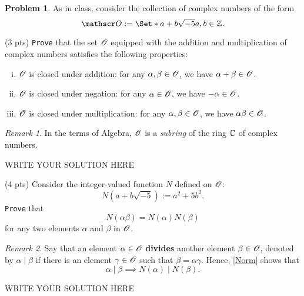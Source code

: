 \documentclass[11pt]{article}
\theoremstyle{plain}
\theoremstyle{definition}
\newtheorem{problem}{Problem}
\theoremstyle{remark}
\newtheorem*{remark}{Remark}
\numberwithin{equation}{problem}
\providecommand\given{}
\begin{document}
\begin{problem}\label{p4}
	As in class, consider the collection of complex numbers of the form
	\[
		\scrO := \Set*{	a+b\sqrt{-5}	\given	a,b\in\Z	}.
	\]
	\begin{listinprob}
		\item (3 pts) \texttt{Prove} that the set $\mathscr{O}$ equipped with the addition and multiplication of complex numbers satisfies the following properties:
		\begin{enumerate}[(i)]
			\item $\mathscr{O}$ is closed under addition: for any $\alpha,\beta\in\mathscr{O}$, we have $\alpha+\beta\in\mathscr{O}$.
			\item $\mathscr{O}$ is closed under negation: for any $\alpha\in\mathscr{O}$, we have $-\alpha\in\mathscr{O}$.
			\item $\mathscr{O}$ is closed under multiplication: for any $\alpha,\beta\in\mathscr{O}$, we have $\alpha\beta\in\mathscr{O}$.
		\end{enumerate}
		\begin{remark}
			In the terms of Algebra, $\mathscr{O}$ is a \emph{subring} of the ring $\mathbb{C}$ of complex numbers.
		\end{remark}		

\begin{solution} %
WRITE YOUR SOLUTION HERE
\end{solution}\clearpage %


		\item\label{Norm} (4 pts) Consider the integer-valued function $N$ defined on $\mathscr{O}$: 
		\[
			N(a+b\sqrt{-5}) := a^2+5b^2.
		\]
		\texttt{Prove} that 
		\[
			N(\alpha\beta) = N(\alpha)N(\beta)
		\]
		for any two elements $\alpha$ and $\beta$ in $\mathscr{O}$.
		\begin{remark}
			Say that an element $\alpha\in\mathscr{O}$ \textbf{divides} another element $\beta\in\mathscr{O}$, denoted by $\alpha\mid\beta$ if there is an element $\gamma\in\mathscr{O}$ such that $\beta=\alpha\gamma$. Hence, \cref{Norm} shows that 
			\[
				\alpha \mid \beta \implies N(\alpha) \mid N(\beta).
			\]
		\end{remark}		

\begin{solution} %
WRITE YOUR SOLUTION HERE
\end{solution}\clearpage %



\end{listinprob}
\end{problem}
\end{document}
